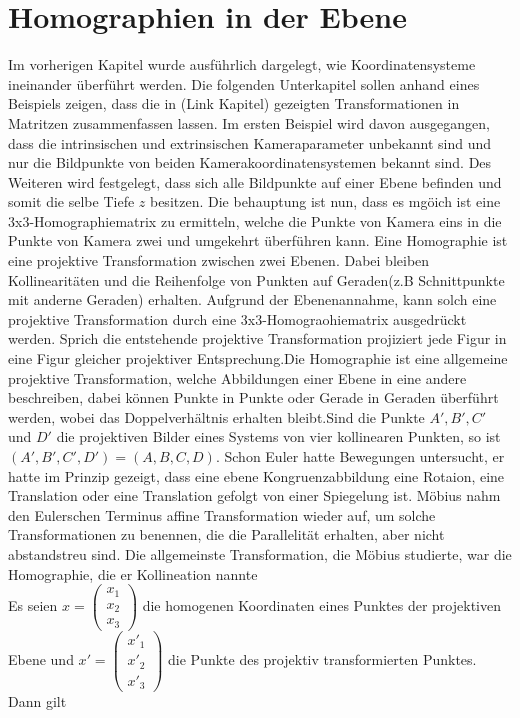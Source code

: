 \chapter{Homographien in der Ebene}

Im vorherigen Kapitel wurde ausführlich dargelegt, wie Koordinatensysteme ineinander überführt werden. Die folgenden Unterkapitel sollen anhand eines Beispiels zeigen, dass die in (Link Kapitel) gezeigten Transformationen in Matritzen zusammenfassen lassen. Im ersten Beispiel wird davon ausgegangen, dass die intrinsischen und extrinsischen Kameraparameter unbekannt sind und nur die Bildpunkte von beiden Kamerakoordinatensystemen bekannt sind. Des Weiteren wird festgelegt, dass sich alle Bildpunkte auf einer Ebene befinden und somit die selbe Tiefe $z$ besitzen. Die behauptung ist nun, dass es mgöich ist eine 3x3-Homographiematrix zu ermitteln, welche die Punkte von Kamera eins in die Punkte von Kamera zwei und umgekehrt überführen kann. Eine Homographie ist eine projektive Transformation zwischen zwei Ebenen. Dabei bleiben Kollinearitäten und die Reihenfolge von Punkten auf Geraden(z.B Schnittpunkte mit anderne Geraden) erhalten. Aufgrund der Ebenenannahme, kann solch eine projektive Transformation durch eine 3x3-Homograohiematrix ausgedrückt werden\cite{Roser}. Sprich die entstehende projektive Transformation projiziert jede Figur in eine Figur gleicher projektiver Entsprechung\cite{HZ}.Die Homographie ist eine allgemeine projektive Transformation, welche Abbildungen einer Ebene in eine andere beschreiben, dabei können Punkte in Punkte oder Gerade in Geraden überführt werden, wobei das Doppelverhältnis erhalten bleibt.Sind die Punkte $A',B',C'$ und $D'$ die projektiven Bilder eines Systems von vier kollinearen Punkten, so ist $(A',B',C',D') =(A,B,C,D)$\cite{Peiffer}. Schon Euler hatte Bewegungen untersucht, er hatte im Prinzip gezeigt, dass eine ebene Kongruenzabbildung eine Rotaion, eine Translation oder eine Translation gefolgt von einer Spiegelung ist. Möbius nahm den Eulerschen Terminus affine Transformation wieder auf, um solche Transformationen zu benennen, die die Parallelität erhalten, aber nicht abstandstreu sind. Die allgemeinste Transformation, die Möbius studierte, war die Homographie, die er Kollineation nannte\cite{Peiffer}\\



 
Es seien \ensuremath{x = \begin{pmatrix}
		x_1\\x_2\\x_3
\end{pmatrix}} die homogenen Koordinaten eines Punktes der projektiven Ebene und \ensuremath{x' = \begin{pmatrix}
x'_1\\x'_2\\x'_3
\end{pmatrix}} die Punkte des projektiv transformierten Punktes. Dann gilt

